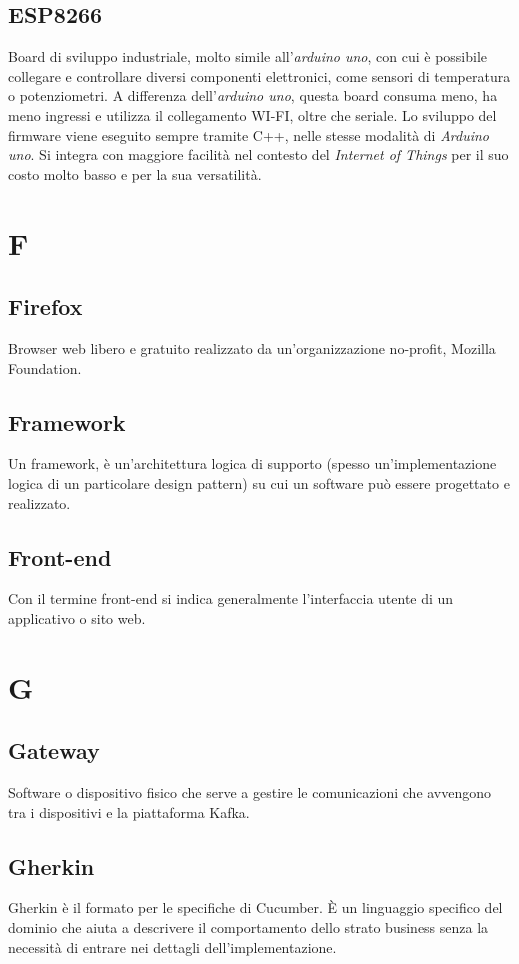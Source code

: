 \subsection{ESP8266}  Board di sviluppo industriale, molto simile all'\textit{arduino uno}, con cui è possibile collegare e controllare diversi componenti elettronici, come sensori di temperatura o potenziometri. A differenza dell'\textit{arduino uno}, questa board consuma meno, ha meno ingressi e utilizza il collegamento WI-FI, oltre che seriale. Lo sviluppo del firmware viene eseguito sempre tramite C++, nelle stesse modalità di \textit{Arduino uno}. Si integra con maggiore facilità nel contesto del \textit{Internet of Things} per il suo costo molto basso e per la sua versatilità.


\newpage \section{F} %
\subsection{Firefox}  Browser web libero e gratuito realizzato da un'organizzazione no-profit, Mozilla Foundation.
\subsection{Framework}  Un framework, è un'architettura logica di supporto (spesso un'implementazione logica di un particolare design pattern) su cui un software può essere progettato e realizzato.
\subsection{Front-end}  Con il termine front-end si indica generalmente l'interfaccia utente di un applicativo o sito web.

\newpage \section{G}
\subsection{Gateway}  Software o dispositivo fisico che serve a gestire le comunicazioni che avvengono tra i dispositivi e la piattaforma Kafka.
\subsection{Gherkin}  Gherkin è il formato per le specifiche di Cucumber. È un linguaggio specifico del dominio che aiuta a descrivere il comportamento dello strato business senza la necessità di entrare nei dettagli dell'implementazione.
